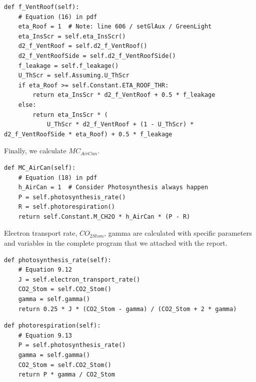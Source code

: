 \documentclass[a4paper]{article}
\begin{document}
\begin{mdframed}[leftline=false,rightline=false,backgroundcolor=magenta!10]
  \begin{verbatim}
def f_VentRoof(self):
    # Equation (16) in pdf
    eta_Roof = 1  # Note: line 606 / setGlAux / GreenLight
    eta_InsScr = self.eta_InsScr()
    d2_f_VentRoof = self.d2_f_VentRoof()
    d2_f_VentRoofSide = self.d2_f_VentRoofSide()
    f_leakage = self.f_leakage()
    U_ThScr = self.Assuming.U_ThScr
    if eta_Roof >= self.Constant.ETA_ROOF_THR:
        return eta_InsScr * d2_f_VentRoof + 0.5 * f_leakage
    else:
        return eta_InsScr * (
            U_ThScr * d2_f_VentRoof + (1 - U_ThScr) * d2_f_VentRoofSide * eta_Roof) + 0.5 * f_leakage
  \end{verbatim}
\end{mdframed}

Finally, we calculate \(MC_{AirCan}\).
\begin{mdframed}[leftline=false,rightline=false,backgroundcolor=magenta!10]
  \begin{verbatim}
def MC_AirCan(self):
    # Equation (18) in pdf
    h_AirCan = 1  # Consider Photosynthesis always happen
    P = self.photosynthesis_rate()
    R = self.photorespiration()
    return self.Constant.M_CH2O * h_AirCan * (P - R)
  \end{verbatim}
\end{mdframed}

Electron transport rate, \(CO_{2 Stom}\), gamma are calculated with specific parameters and variables in the complete program that we attached with the report.
\begin{mdframed}[leftline=false,rightline=false,backgroundcolor=magenta!10]
  \begin{verbatim}
def photosynthesis_rate(self):
    # Equation 9.12
    J = self.electron_transport_rate()
    CO2_Stom = self.CO2_Stom()
    gamma = self.gamma()
    return 0.25 * J * (CO2_Stom - gamma) / (CO2_Stom + 2 * gamma)
  \end{verbatim}
\end{mdframed}

\begin{mdframed}[leftline=false,rightline=false,backgroundcolor=magenta!10]
  \begin{verbatim}
def photorespiration(self):
    # Equation 9.13
    P = self.photosynthesis_rate()
    gamma = self.gamma()
    CO2_Stom = self.CO2_Stom()
    return P * gamma / CO2_Stom
  \end{verbatim}
\end{mdframed}
\end{document}
